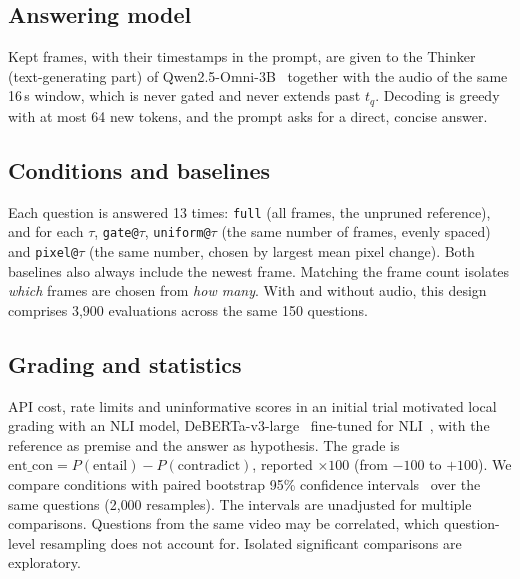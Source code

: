 \documentclass[conference]{IEEEtran}
\newcommand{\cond}[1]{\texttt{#1}}
\begin{document}
\subsection{Answering model}
Kept frames, with their timestamps in the prompt, are given to the Thinker (text-generating part) of Qwen2.5-Omni-3B~\cite{xu2025qwen25omni} together with the audio of the same 16\,s window, which is never gated and never extends past $t_q$. Decoding is greedy with at most 64 new tokens, and the prompt asks for a direct, concise answer.

\subsection{Conditions and baselines}
Each question is answered 13 times: \cond{full} (all frames, the unpruned reference), and for each $\tau$, \cond{gate@$\tau$}, \cond{uniform@$\tau$} (the same number of frames, evenly spaced) and \cond{pixel@$\tau$} (the same number, chosen by largest mean pixel change). Both baselines also always include the newest frame. Matching the frame count isolates \emph{which} frames are chosen from \emph{how many}. With and without audio, this design comprises 3{,}900 evaluations across the same 150 questions.

\subsection{Grading and statistics}
API cost, rate limits and uninformative scores in an initial trial motivated local grading with an NLI model, DeBERTa-v3-large~\cite{he2023debertav3} fine-tuned for NLI~\cite{laurer2022nli}, with the reference as premise and the answer as hypothesis. The grade is $\text{ent\_con}=P(\text{entail})-P(\text{contradict})$, reported $\times100$ (from $-100$ to $+100$). We compare conditions with paired bootstrap 95\% confidence intervals~\cite{efron1993bootstrap} over the same questions (2{,}000 resamples). The intervals are unadjusted for multiple comparisons. Questions from the same video may be correlated, which question-level resampling does not account for. Isolated significant comparisons are exploratory.
\end{document}
